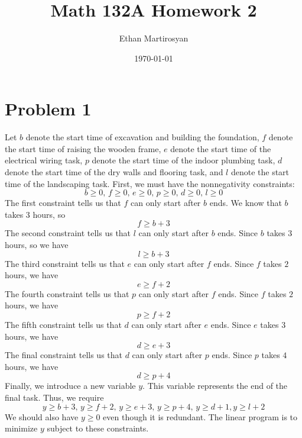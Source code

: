 \documentclass[12pt]{article}
\begin{document}
 
\title{Math 132A Homework 2}
\author{Ethan Martirosyan}
\date{\today}
\maketitle
{}
\hfuzz=50pt
\section*{Problem 1}
Let $b$ denote the start time of excavation and building the foundation, $f$ denote the start time of raising the wooden frame, $e$ denote the start time of the electrical wiring task, $p$ denote the start time of the indoor plumbing task, $d$ denote the start time of the dry walls and flooring task, and $l$ denote the start time of the landscaping task. First, we must have the nonnegativity constraints:
\[
b \geq 0,\, f \geq 0,\, e \geq 0,\, p \geq 0,\, d \geq 0,\, l \geq 0
\] The first constraint tells us that $f$ can only start after $b$ ends. We know that $b$ takes $3$ hours, so
\[
f \geq b + 3
\] The second constraint tells us that $l$ can only start after $b$ ends. Since $b$ takes $3$ hours, so we have
\[
l \geq b + 3
\] The third constraint tells us that $e$ can only start after $f$ ends. Since $f$ takes $2$ hours, we have 
\[
e \geq f+2
\] The fourth constraint tells us that $p$ can only start after $f$ ends. Since $f$ takes $2$ hours, we have
\[
p \geq f+2
\] The fifth constraint tells us that $d$ can only start after $e$ ends. Since $e$ takes $3$ hours, we have
\[
d \geq e + 3
\] The final constraint tells us that $d$ can only start after $p$ ends. Since $p$ takes $4$ hours, we have
\[
d \geq p + 4
\] Finally, we introduce a new variable $y$. This variable represents the end of the final task. Thus, we require
\[
y \geq b+3,\, y\geq f+2,\, y \geq e+3,\, y \geq p +4,\, y \geq d+1, y \geq l+2
\] We should also have $y \geq 0$ even though it is redundant. The linear program is to minimize $y$ subject to these constraints.
\end{document}
